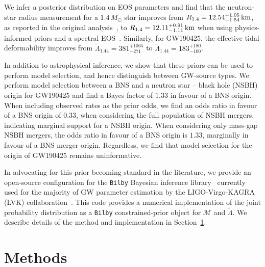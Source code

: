 \documentclass[twocolumn,linenumbers]{aastex631}
\begin{document}
We infer a posterior distribution on EOS parameters and find that the
neutron-star radius measurement for a $1.4\,{M_\odot}$ star improves from
${R_{1.4}}=12.54^{+1.05}_{-1.54}\,{\rm km}$, as reported in the original
analysis~\citep{abbott19_170817Properties}, to
${R_{1.4}}=12.11^{+0.91}_{-1.11}\,{\rm km}$ when using physics-informed
priors and a spectral EOS~\citep[see also][for some of the first
  estimates made after the GW170817
  event]{Most2018,Capano2020}. Similarly, for GW190425, the effective
tidal deformability improves from $\tilde{\Lambda}_{1.44} =
381^{+1065}_{-271}$ to $\tilde{\Lambda}_{1.44} = 183^{+180}_{-100}$.

In addition to astrophysical inference, we show that these priors can be
used to perform model selection, and hence distinguish between GW-source
types. We perform model selection between a BNS and a neutron star --
black hole (NSBH) origin for GW190425 and find a Bayes factor of $1.33$
in favour of a BNS origin. When including observed rates as the prior
odds, we find an odds ratio in favour of a BNS origin of $0.33$,
when considering the full population of NSBH mergers, indicating marginal
support for a NSBH origin.  When considering only mass-gap NSBH mergers,
the odds ratio in favour of a BNS origin is $1.33$, marginally in
favour of a BNS merger origin. Regardless, we find that model selection
for the origin of GW190425 remains uninformative.
	
In advocating for this prior becoming standard in the literature, we
provide an open-source configuration for the \texttt{Bilby} Bayesian
inference library~\citep{ashton19,romeroshaw20} currently used for the
majority of GW parameter estimation by the LIGO-Virgo-KAGRA (LVK)
collaboration~\citep[e.g.,][]{LIGO, Virgo, KAGRA}. This code provides a
numerical implementation of the joint probability distribution as a
\texttt{Bilby} constrained-prior object for $\mathcal{M}$ and
$\tilde{\Lambda}$. We describe details of the method and implementation
in Section~\ref{sec:Methods}.


\section{Methods}
\label{sec:Methods}
	
\end{document}
